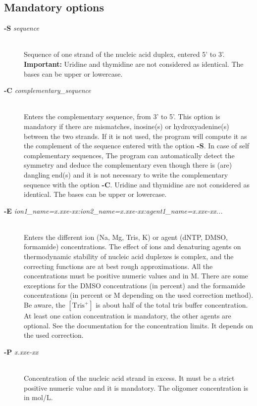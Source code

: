 \documentclass{article}
\begin{document}
\subsection{Mandatory options}
\begin{description}

\item [\textbf{-S} \textit{sequence}  ]\mbox{}\\ 
  Sequence of one strand of the nucleic 
  acid duplex, entered 5' to 3'. \textbf{Important:} 
  Uridine and thymidine are not considered as identical. The bases can be upper or lowercase.
\item [\textbf{-C} \textit{complementary\_sequence}] \mbox{}\\
  Enters the complementary sequence, from 3' to 5'. This option is mandatory if
  there are mismatches, inosine(s) or hydroxyadenine(s) between the two strands. If it is not used, the program
  will compute it as the complement of the sequence entered with the option \textbf{-S}. In case of self complementary sequences,
  The program can automatically detect the symmetry and deduce the complementary even though there is (are) dangling
  end(s) and it is not necessary to write the complementary sequence with the option \textbf{-C}.
  Uridine and thymidine are not considered as identical. The bases can be upper or lowercase.
\item [\textbf{-E} \textit{ion1\_name=x.xxe-xx:ion2\_name=x.xxe-xx:agent1\_name=x.xxe-xx...}] \mbox{}\\
  Enters the different ion (Na, Mg, Tris, K) or agent (dNTP, DMSO, formamide) concentrations. The effect  
  of  ions and denaturing agents on  thermodynamic  stability  of nucleic  acid duplexes is complex,
  and the correcting functions are  at  best rough  approximations. All the concentrations must be positive numeric
  values and in M. There are some exceptions for the DMSO concentrations (in
  percent) and the formamide concentrations
  (in percent or M depending on the used correction method). Be aware, the $[\mbox{Tris}^+]$ is about half of the total tris buffer
  concentration.
  At least one cation concentration is mandatory, the other agents are optional. See the documentation for the concentration 
  limits. It depends on the used correction.
\item [\textbf{-P} \textit{x.xxe-xx}]\mbox{}\\ 
  Concentration of the nucleic acid strand in excess. It must be a strict positive numeric value and it is mandatory. The oligomer
  concentration is in mol/L.

\end{description}
\end{document}
